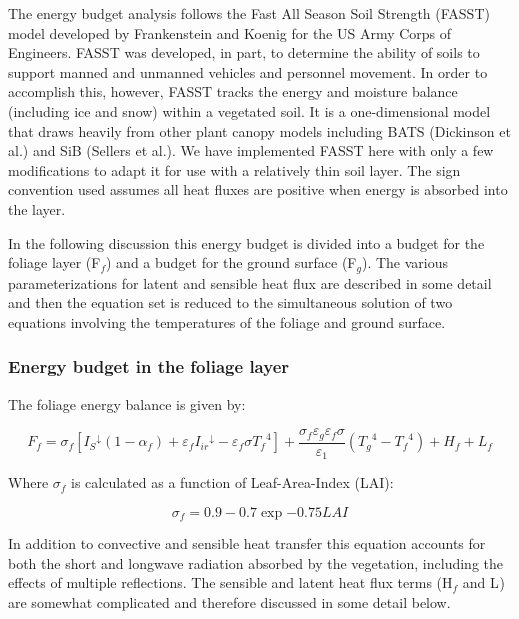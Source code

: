 The energy budget analysis follows the Fast All Season Soil Strength (FASST) model developed by Frankenstein and Koenig for the US Army Corps of Engineers. FASST was developed, in part, to determine the ability of soils to support manned and unmanned vehicles and personnel movement. In order to accomplish this, however, FASST tracks the energy and moisture balance (including ice and snow) within a vegetated soil. It is a one-dimensional model that draws heavily from other plant canopy models including BATS (Dickinson et al.) and SiB (Sellers et al.). We have implemented FASST here with only a few modifications to adapt it for use with a relatively thin soil layer. The sign convention used assumes all heat fluxes are positive when energy is absorbed into the layer.

In the following discussion this energy budget is divided into a budget for the foliage layer (F\(_{f}\)) and a budget for the ground surface (F\(_{g}\)­). The various parameterizations for latent and sensible heat flux are described in some detail and then the equation set is reduced to the simultaneous solution of two equations involving the temperatures of the foliage and ground surface.

\subsubsection{Energy budget in the foliage layer}\label{energy-budget-in-the-foliage-layer}

The foliage energy balance is given by:

\begin{equation}
{F_f} = {\sigma_f}\left[ {{I_S}^ \downarrow (1 - {\alpha_f}) + {\varepsilon_f}{I_{ir}}^ \downarrow  - {\varepsilon_f}\sigma {T_f}^4} \right] + \frac{{{\sigma_f}{\varepsilon_g}{\varepsilon_f}\sigma }}{{{\varepsilon_1}}}\left( {{T_g}^4 - {T_f}^4} \right) + {H_f} + {L_f}
\end{equation}

Where $\sigma$\(_{f}\) is calculated as a function of Leaf-Area-Index (LAI):

\begin{equation}
\sigma_f = 0.9 - 0.7 \exp{-0.75 LAI }
\end{equation}

In addition to convective and sensible heat transfer this equation accounts for both the short and longwave radiation absorbed by the vegetation, including the effects of multiple reflections. The sensible and latent heat flux terms (H\(_{f}\) and L\(_{­}\)) are somewhat complicated and therefore discussed in some detail below.

